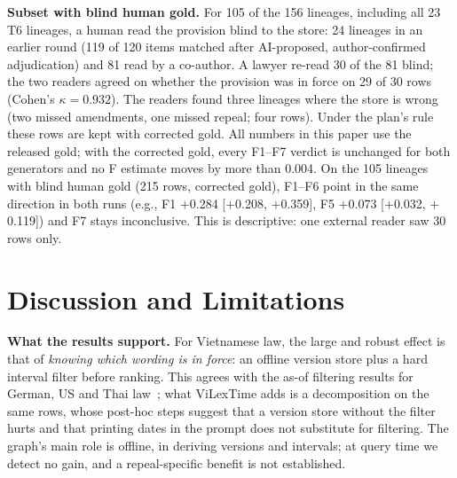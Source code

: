 \documentclass[sigconf,anonymous,review]{acmart}
\begin{document}
\textbf{Subset with blind human gold.} For 105 of the 156 lineages, including all 23 T6 lineages, a human read the provision blind to the store: 24 lineages in an earlier round (119 of 120 items matched after AI-proposed, author-confirmed adjudication) and 81 read by a co-author. A lawyer re-read 30 of the 81 blind; the two readers agreed on whether the provision was in force on 29 of 30 rows (Cohen's $\kappa=0.932$). The readers found three lineages where the store is wrong (two missed amendments, one missed repeal; four rows). Under the plan's rule these rows are kept with corrected gold. All numbers in this paper use the released gold; with the corrected gold, every F1--F7 verdict is unchanged for both generators and no F estimate moves by more than 0.004. On the 105 lineages with blind human gold (215 rows, corrected gold), F1--F6 point in the same direction in both runs (e.g., F1 $+$0.284 [$+$0.208, $+$0.359], F5 $+$0.073 [$+$0.032, $+$0.119]) and F7 stays inconclusive. This is descriptive: one external reader saw 30 rows only.

\section{Discussion and Limitations}
\label{sec:discussion}

\textbf{What the results support.} For Vietnamese law, the large and robust effect is that of \emph{knowing which wording is in force}: an offline version store plus a hard interval filter before ranking. This agrees with the as-of filtering results for German, US and Thai law~\cite{prior2026oldfriend,yao2026lawinforce,akarajaradwong2026nitibenchplus}; what ViLexTime adds is a decomposition on the same rows, whose post-hoc steps suggest that a version store without the filter hurts and that printing dates in the prompt does not substitute for filtering. The graph's main role is offline, in deriving versions and intervals; at query time we detect no gain, and a repeal-specific benefit is not established.
\end{document}
